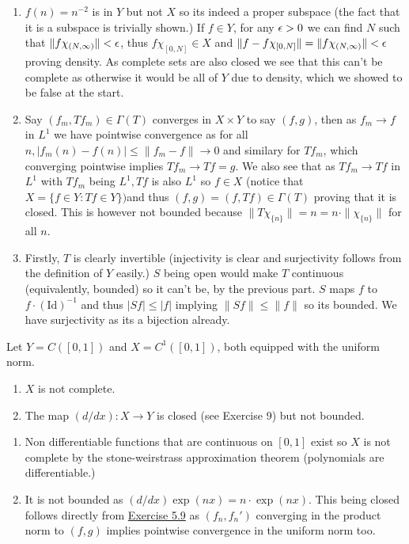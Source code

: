 \documentclass[12pt,a4paper]{article}
\begin{document}
\begin{solution}
    \begin{enumerate}[label=\alph*.]
        \item $f(n)=n^{-2}$ is in $Y$ but not $X$ so its indeed a proper subspace (the fact that it is a subspace is trivially shown.) 
            If $f\in Y$, for any $\epsilon>0$ we can find $N$ such that $\|f\chi_{(N,\infty)}\|<\epsilon$, thus $f\chi_{[0,N]}\in X$ and $\|f-f\chi_{[0,N]}\|=\|f\chi_{(N,\infty)}\|<\epsilon$ proving density. 
            As complete sets are also closed we see that this can't be complete as otherwise it would be all of $Y$ due to density, which we showed to be false at the start. 
        \item Say $(f_m,Tf_m)\in\Gamma(T)$ converges in $X\times Y$ to say $(f,g)$, then as $f_m\to f$ in $L^1$ we have pointwise convergence as for all $n,|f_m(n)-f(n)|\leq\|f_m-f\|\to 0$ and similary for $Tf_m$, which converging pointwise implies $Tf_m\to Tf=g$. 
            We also see that as $Tf_m\to Tf$ in $L^1$ with $Tf_m$ being $L^1, Tf$ is also $L^1$ so $f\in X$ (notice that $X=\{f\in Y:Tf\in Y\}) $and thus $(f,g)=(f,Tf)\in\Gamma(T)$ proving that it is closed. 
            This is however not bounded because $\|T\chi_{\{n\}}\|=n=n\cdot\|\chi_{\{n\}}\|$ for all $n.$ 
        \item Firstly, $T$ is clearly invertible (injectivity is clear and surjectivity follows from the definition of $Y$ easily.) 
            $S$ being open would make $T$ continuous (equivalently, bounded) so it can't be, by the previous part. 
            $S$ maps $f$ to $f\cdot(\text{Id})^{-1}$ and thus $|Sf|\leq|f|$ implying $\|Sf\|\leq\|f\|$ so its bounded. 
            We have surjectivity as its a bijection already. 
    \end{enumerate}
\end{solution}
\begin{problem}\label{prob:5-30}
Let $Y = C([0,1])$ and $X = C^1([0,1])$, both equipped with the uniform norm.
\begin{enumerate}[label=\alph*.]
\item $X$ is not complete.
\item The map $(d/dx) : X \rightarrow Y$ is closed (see Exercise 9) but not bounded.
\end{enumerate}
\end{problem}
\begin{solution}
    \begin{enumerate}[label=\alph*.]
        \item Non differentiable functions that are continuous on $[0,1]$ exist so $X$ is not complete by the stone-weirstrass approximation theorem (polynomials are differentiable.) 
        \item It is not bounded as $(d/dx)\exp(nx)=n\cdot\exp(nx)$. 
            This being closed follows directly from \hyperref[prob:5-9]{Exercise 5.9} as $(f_n,f_n')$ converging in the product norm to $(f,g)$ implies pointwise convergence in the uniform norm too. 
    \end{enumerate}
    
\end{solution}
\end{document}
